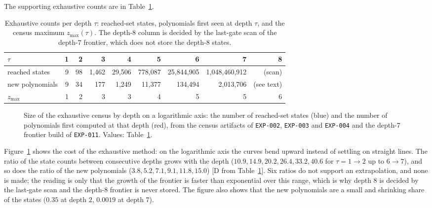 \documentclass[11pt]{article}
\theoremstyle{definition}
\theoremstyle{remark}
\newcommand{\zmax}{z_{\max}}
\begin{document}
The supporting exhaustive counts are in Table~\ref{tab:counts}.

\begin{table}[t]
\centering
\caption{Exhaustive counts per depth $\tau$: reached-set states, polynomials first seen at
depth $\tau$, and the census maximum $\zmax(\tau)$. The depth-$8$ column is decided by the
last-gate scan of the depth-$7$ frontier, which does not store the depth-$8$ states.}
\label{tab:counts}
\begin{tabular}{lrrrrrrrr}
\toprule
$\tau$ & 1 & 2 & 3 & 4 & 5 & 6 & 7 & 8\\
\midrule
reached states & 9 & 98 & 1{,}462 & 29{,}506 & 778{,}087 & 25{,}844{,}905 & 1{,}048{,}460{,}912 & (scan)\\
new polynomials & 9 & 34 & 177 & 1{,}249 & 11{,}377 & 134{,}494 & 2{,}013{,}706 & (see text)\\
$\zmax$ & 1 & 2 & 3 & 3 & 4 & 5 & 5 & 6\\
\bottomrule
\end{tabular}
\end{table}

\begin{figure}[t]
\centering
{}
\caption{Size of the exhaustive census by depth on a logarithmic axis: the number of reached-set
states (blue) and the number of polynomials first computed at that depth (red), from the census
artifacts of \texttt{EXP-002}, \texttt{EXP-003} and \texttt{EXP-004} and the depth-$7$ frontier build of \texttt{EXP-011}. Values:
Table~\ref{tab:counts}.}
\label{fig:counts}
\end{figure}

Figure~\ref{fig:counts} shows the cost of the exhaustive method: on the logarithmic axis the
curves bend upward instead of settling on straight lines. The ratio of the state counts between
consecutive depths grows with the depth ($10.9, 14.9, 20.2, 26.4, 33.2, 40.6$ for
$\tau = 1 \to 2$ up to $6 \to 7$), and so does the ratio of the new polynomials ($3.8, 5.2, 7.1,
9.1, 11.8, 15.0$) [D from Table~\ref{tab:counts}]. Six ratios do not support an extrapolation, and
none is made; the reading is only that the growth of the frontier is faster than exponential
over this range, which is why depth $8$ is decided by the last-gate scan and the depth-$8$
frontier is never stored. The figure also shows that the new polynomials are a small and
shrinking share of the states ($0.35$ at depth $2$, $0.0019$ at depth $7$).
\end{document}
